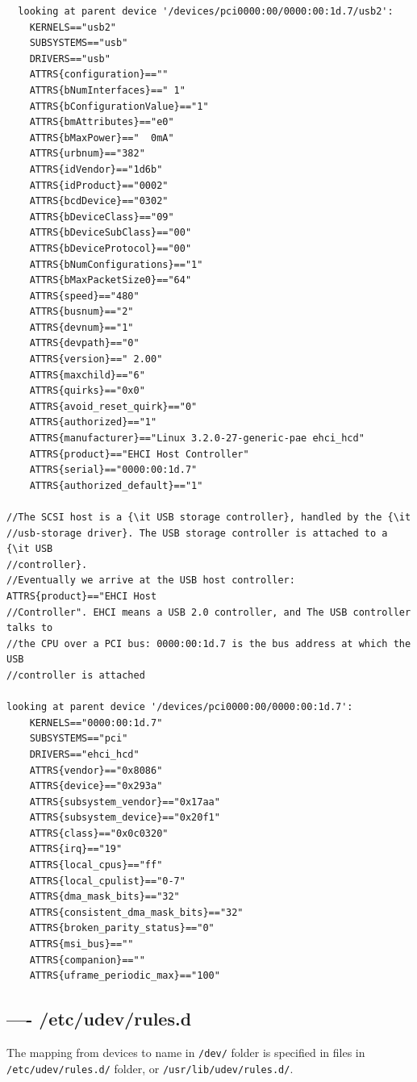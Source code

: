 \begin{verbatim}
  looking at parent device '/devices/pci0000:00/0000:00:1d.7/usb2':
    KERNELS=="usb2"
    SUBSYSTEMS=="usb"
    DRIVERS=="usb"
    ATTRS{configuration}==""
    ATTRS{bNumInterfaces}==" 1"
    ATTRS{bConfigurationValue}=="1"
    ATTRS{bmAttributes}=="e0"
    ATTRS{bMaxPower}=="  0mA"
    ATTRS{urbnum}=="382"
    ATTRS{idVendor}=="1d6b"
    ATTRS{idProduct}=="0002"
    ATTRS{bcdDevice}=="0302"
    ATTRS{bDeviceClass}=="09"
    ATTRS{bDeviceSubClass}=="00"
    ATTRS{bDeviceProtocol}=="00"
    ATTRS{bNumConfigurations}=="1"
    ATTRS{bMaxPacketSize0}=="64"
    ATTRS{speed}=="480"
    ATTRS{busnum}=="2"
    ATTRS{devnum}=="1"
    ATTRS{devpath}=="0"
    ATTRS{version}==" 2.00"
    ATTRS{maxchild}=="6"
    ATTRS{quirks}=="0x0"
    ATTRS{avoid_reset_quirk}=="0"
    ATTRS{authorized}=="1"
    ATTRS{manufacturer}=="Linux 3.2.0-27-generic-pae ehci_hcd"
    ATTRS{product}=="EHCI Host Controller"
    ATTRS{serial}=="0000:00:1d.7"
    ATTRS{authorized_default}=="1"

//The SCSI host is a {\it USB storage controller}, handled by the {\it
//usb-storage driver}. The USB storage controller is attached to a {\it USB
//controller}.
//Eventually we arrive at the USB host controller: ATTRS{product}=="EHCI Host
//Controller". EHCI means a USB 2.0 controller, and The USB controller talks to
//the CPU over a PCI bus: 0000:00:1d.7 is the bus address at which the USB
//controller is attached 

looking at parent device '/devices/pci0000:00/0000:00:1d.7':
    KERNELS=="0000:00:1d.7"
    SUBSYSTEMS=="pci"
    DRIVERS=="ehci_hcd"
    ATTRS{vendor}=="0x8086"
    ATTRS{device}=="0x293a"
    ATTRS{subsystem_vendor}=="0x17aa"
    ATTRS{subsystem_device}=="0x20f1"
    ATTRS{class}=="0x0c0320"
    ATTRS{irq}=="19"
    ATTRS{local_cpus}=="ff"
    ATTRS{local_cpulist}=="0-7"
    ATTRS{dma_mask_bits}=="32"
    ATTRS{consistent_dma_mask_bits}=="32"
    ATTRS{broken_parity_status}=="0"
    ATTRS{msi_bus}==""
    ATTRS{companion}==""
    ATTRS{uframe_periodic_max}=="100"
\end{verbatim}



\subsection{---- /etc/udev/rules.d}
\label{sec:udev-rules.d}

The mapping from devices to name in \verb!/dev/! folder is specified in files in
\verb!/etc/udev/rules.d/! folder, or \verb!/usr/lib/udev/rules.d/!.



